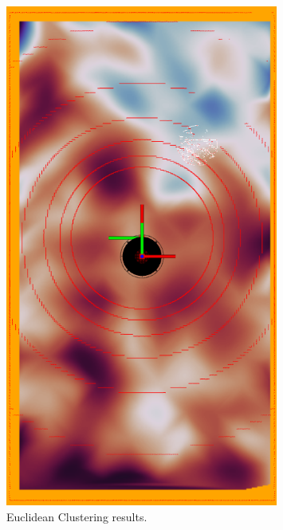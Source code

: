 \begin{figure}[H]
    \centering
    \begin{minipage}{0.45\textwidth}
        \centering
        \includegraphics[width=0.8\textwidth]{figs/clustering_results.png}
        \caption{Euclidean Clustering results.}
        \label{fig:clustering}
    \end{minipage}
    \hfill
    \begin{minipage}{0.45\textwidth}
        \centering

\end{minipage}
\end{figure}
